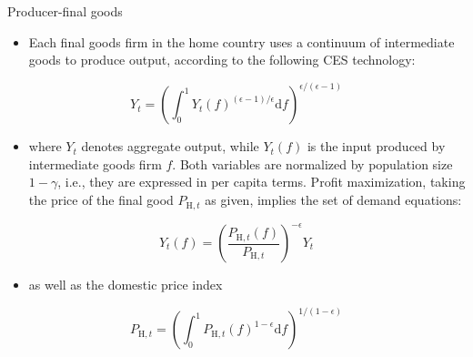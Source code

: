 \documentclass[10pt]{beamer}
\begin{document}
\begin{frame}{Producer-final goods}

\begin{itemize}
    \item Each final goods firm in the home country uses a continuum of intermediate goods to produce output, according to the following CES technology:
\end{itemize}


$$
Y_{t}=\left(\int_{0}^{1} Y_{t}(f)^{(\epsilon-1) / \epsilon} \mathrm{d} f\right)^{\epsilon /(\epsilon-1)}
$$

\begin{itemize}
    \item where $Y_{t}$ denotes aggregate output, while $Y_{t}(f)$ is the input produced by intermediate goods firm $f$. Both variables are normalized by population size $1-\gamma$, i.e., they are expressed in per capita terms. Profit maximization, taking the price of the final good $P_{\mathrm{H}, t}$ as given, implies the set of demand equations:
\end{itemize}

$$
Y_{t}(f)=\left(\frac{P_{\mathrm{H}, t}(f)}{P_{\mathrm{H}, t}}\right)^{-\epsilon} Y_{t}
$$

\begin{itemize}
    \item as well as the domestic price index
\end{itemize}


$$
P_{\mathrm{H}, t}=\left(\int_{0}^{1} P_{\mathrm{H}, t}(f)^{1-\epsilon} \mathrm{d} f\right)^{1 /(1-\epsilon)}
$$

\end{frame}
\end{document}
